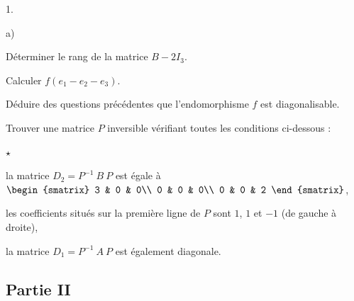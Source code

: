 \begin{noliste}{1.}
\begin{noliste}{a)}
    

  \item Déterminer le rang de la matrice $B-2I_{3}$.

    

  \item Calculer $f(e_{1} - e_{2} - e_{3})$.

    
    
  \item Déduire des questions précédentes que l'endomorphisme $f$ est
    diagonalisable.

    
  \end{noliste}
  
\item Trouver une matrice $P$ inversible vérifiant toutes les
  conditions ci-dessous :
  \begin{noliste}{$\star$}
  \item la matrice $D_{2} = P^{-1} \ B \ P$ est égale à
    $\begin{smatrix}
      3 & 0 & 0\\
      0 & 0 & 0\\
      0 & 0 & 2
    \end{smatrix}
    $,
  \item les coefficients situés sur la première ligne de $P$ sont $1$,
    $1$ et $-1$ (de gauche à droite),
  \item la matrice $D_{1} = P^{-1}\ A \ P$ est également diagonale.
  \end{noliste}

  
\end{noliste}

\subsection*{Partie II} 

